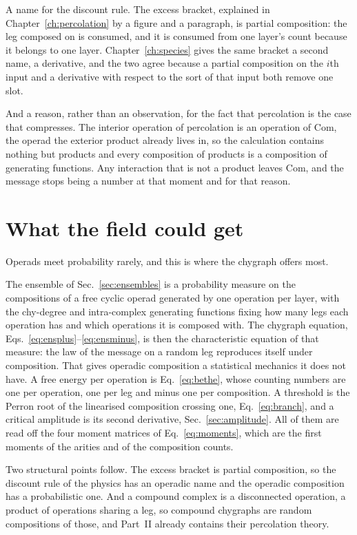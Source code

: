 A name for the discount rule. The excess bracket, explained in
Chapter~\ref{ch:percolation} by a figure and a paragraph, is partial
composition: the leg composed on is consumed, and it is consumed from one
layer's count because it belongs to one layer. Chapter~\ref{ch:species} gives
the same bracket a second name, a derivative, and the two agree because a
partial composition on the $i$th input and a derivative with respect to the
sort of that input both remove one slot.

And a reason, rather than an observation, for the fact that percolation is
the case that compresses. The interior operation of percolation is an
operation of $\mathrm{Com}$, the operad the exterior product already lives
in, so the calculation contains nothing but products and every composition
of products is a composition of generating functions. Any interaction that
is not a product leaves $\mathrm{Com}$, and the message stops being a number
at that moment and for that reason.

\section{What the field could get}
\label{sec:op-field}

Operads meet probability rarely, and this is where the chygraph offers most.

The ensemble of Sec.~\ref{sec:ensembles} is a probability measure on the
compositions of a free cyclic operad generated by one operation per layer,
with the chy-degree and intra-complex generating functions fixing how many
legs each operation has and which operations it is composed with. The
chygraph equation, Eqs.~\eqref{eq:ensplus}--\eqref{eq:ensminus}, is then the
characteristic equation of that measure: the law of the message on a random
leg reproduces itself under composition. That gives operadic composition a
statistical mechanics it does not have. A free energy per operation is
Eq.~\eqref{eq:bethe}, whose counting numbers are one per operation, one per
leg and minus one per composition. A threshold is the Perron root of the
linearised composition crossing one, Eq.~\eqref{eq:branch}, and a critical
amplitude is its second derivative, Sec.~\ref{sec:amplitude}. All of them are
read off the four moment matrices of Eq.~\eqref{eq:moments}, which are the
first moments of the arities and of the composition counts.

Two structural points follow. The excess bracket is partial composition, so
the discount rule of the physics has an operadic name and the operadic
composition has a probabilistic one. And a compound complex is a disconnected operation, a product of
operations sharing a leg, so compound chygraphs are random compositions of
those, and Part~II already contains their percolation theory.

